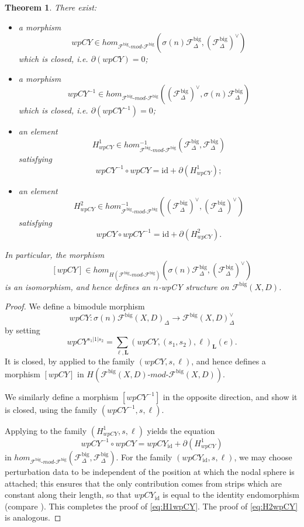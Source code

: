 \documentclass{article}
\newtheorem{thm}[lem]{Theorem}
\def\fuk{\EuF}
\def\fuk{\mathcal{F}}
\def\id{\mathrm{id}}
\newcommand{\bimod}[2]{{{#1}\text{-}mod\text{-}{#2}}}
\def\big{{\operatorname{big}}}
\def\bL{\mathbf{L}}
\begin{document}
\begin{thm}\label{thm:wpcy_big}
    There exist:
    \begin{itemize}
        \item a morphism 
                $$wpCY \in hom_{\bimod{\fuk^\big}{\fuk^\big}}(\sigma(n) \fuk^\big_\Delta,(\fuk^\big_\Delta)^\vee)$$
                which is closed, i.e. $\partial(wpCY) = 0$;
        \item a morphism 
                $$wpCY^{-1} \in hom_{\bimod{\fuk^\big}{\fuk^\big}}((\fuk^\big_\Delta)^\vee,\sigma(n) \fuk^\big_\Delta)$$
                which is closed, i.e. $\partial(wpCY^{-1}) = 0$;
        \item an element 
        $$H^1_{wpCY} \in hom^{-1}_{\bimod{\fuk^\big}{\fuk^\big}}(\fuk^\big_\Delta,\fuk^\big_\Delta)$$
        satisfying 
        \begin{equation}\label{eq:H1wpCY}
        wpCY^{-1} \circ wpCY = \id + \partial(H^1_{wpCY});
        \end{equation}
        \item an element 
        $$H^2_{wpCY} \in hom^{-1}_{\bimod{\fuk^\big}{\fuk^\big}}((\fuk^\big_\Delta)^\vee,(\fuk^\big_\Delta)^\vee)$$
        satisfying
        \begin{equation}\label{eq:H2wpCY}
        wpCY \circ wpCY^{-1} = \id + \partial(H^2_{wpCY}).
        \end{equation}
        \end{itemize}
    In particular, the morphism
    $$[wpCY] \in hom_{H(\bimod{\fuk^\big}{\fuk^\big})}(\sigma(n) \fuk^\big_\Delta,(\fuk^\big_\Delta)^\vee)$$ 
    is an isomorphism, and hence defines an $n$-wpCY structure on $\fuk^\big(X,D)$.
\end{thm}
\begin{proof}
    We define a bimodule morphism
    $$wpCY: \sigma(n) \fuk^\big(X,D)_\Delta \to \fuk^\big(X,D)^\vee_\Delta$$
    by setting
    $$wpCY^{s_1|1|s_2} = \sum_{\ell,\bL} (wpCY,(s_1,s_2),\ell)_{\bL}(e). $$
    It is closed, by \cite[Lemma 4.18]{relfukii} applied to the family $(wpCY,s,\ell)$, and hence defines a morphism $[wpCY]$ in $H(\bimod{\fuk^\big(X,D)}{\fuk^\big(X,D)})$.
    
    We similarly define a morphism $[wpCY^{-1}]$ in the opposite direction, and show it is closed, using the family $(wpCY^{-1},s,\ell)$.

    Applying \cite[Lemma 4.18]{relfukii} to the family $(H^1_{wpCY},s,\ell)$ yields the equation
    $$wpCY^{-1} \circ wpCY = wpCY_{\id} + \partial(H^1_{wpCY})$$
    in $hom_{\bimod{\fuk^\big}{\fuk^\big}}(\fuk^\big_\Delta,\fuk^\big_\Delta)$. 
    For the family $(wpCY_{\id},s,\ell)$, we may choose perturbation data to be independent of the position at which the nodal sphere is attached; this ensures that the only contribution comes from strips which are constant along their length, so that $wpCY_{\id}$ is equal to the identity endomorphism (compare \cite[Theorem 5.8]{relfukii}).
    This completes the proof of \eqref{eq:H1wpCY}.
    The proof of \eqref{eq:H2wpCY} is analogous.
\end{proof}
\end{document}
